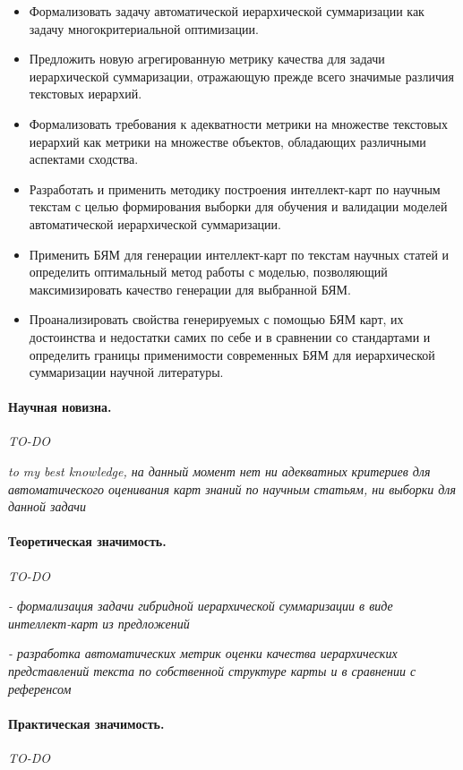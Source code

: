 \documentclass[12pt]{article}
\begin{document}
\begin{itemize}
    \item Формализовать задачу автоматической иерархической суммаризации как задачу многокритериальной оптимизации.
    \item Предложить новую агрегированную метрику качества для задачи иерархической суммаризации, отражающую прежде всего значимые различия текстовых иерархий.
    \item Формализовать требования к адекватности метрики на множестве текстовых иерархий как метрики на множестве объектов, обладающих различными аспектами сходства.
    \item Разработать и применить методику построения интеллект-карт по научным текстам с целью формирования выборки для обучения и валидации моделей автоматической иерархической суммаризации.
    \item Применить БЯМ для генерации интеллект-карт по текстам научных статей и определить оптимальный метод работы с моделью, позволяющий максимизировать качество генерации для выбранной БЯМ.
    \item Проанализировать свойства генерируемых с помощью БЯМ карт, их достоинства и недостатки самих по себе и в сравнении со стандартами и определить границы применимости современных БЯМ для иерархической суммаризации научной литературы. 
\end{itemize}

\paragraph{Научная новизна.} 
\textit{TO-DO}

\textit{to my best knowledge, на данный момент нет ни адекватных критериев для автоматического оценивания карт знаний по научным статьям, ни выборки для данной задачи}


\paragraph{Теоретическая значимость.}
\textit{TO-DO}

\textit{- формализация задачи гибридной иерархической суммаризации в виде интеллект-карт из предложений}

\textit{- разработка автоматических метрик оценки качества иерархических представлений текста по собственной структуре карты и в сравнении с референсом}


\paragraph{Практическая значимость.}
\textit{TO-DO}
\end{document}
